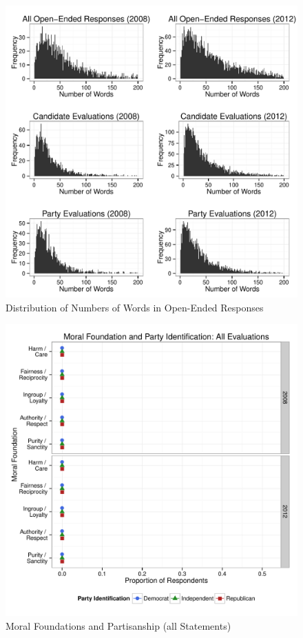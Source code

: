 \documentclass[12pt]{article}
\begin{document}


\begin{figure}[ht]\centering
\includegraphics[scale=.8]{../calc/fig/a0_num.pdf}
\caption{Distribution of Numbers of Words in Open-Ended Responses}\label{fig:a0_num}
\end{figure}

\begin{figure}[ht]\centering
\includegraphics[scale=.4]{../calc/fig/a1_mft_pid.pdf}
\caption{Moral Foundations and Partisanship (all Statements)}\label{fig:a1_mft_pid}
\end{figure}
\end{document}
